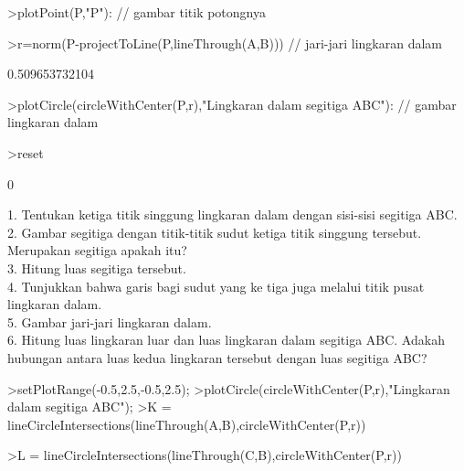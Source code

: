 \documentclass[12pt,Times new roman,letterpaper]{book}
\begin{document}
\begin{eulernootebook}
\begin{eulercomment}
\begin{eulercomment}
\begin{eulernootebook}
\begin{eulercomment}
\begin{eulercomment}
\begin{eulercomment}
\begin{eulercomment}
\begin{eulercomment}
\begin{eulercomment}
\begin{eulernotebook}
\begin{eulercomment}
\begin{eulerprompt}
>plotPoint(P,"P"): // gambar titik potongnya
\end{eulerprompt}
\begin{eulerprompt}
>r=norm(P-projectToLine(P,lineThrough(A,B))) // jari-jari lingkaran dalam
\end{eulerprompt}
\begin{euleroutput}
  0.509653732104
\end{euleroutput}
\begin{eulerprompt}
>plotCircle(circleWithCenter(P,r),"Lingkaran dalam segitiga ABC"): // gambar lingkaran dalam
\end{eulerprompt}
\begin{eulerprompt}
>reset
\end{eulerprompt}
\begin{euleroutput}
  0
\end{euleroutput}
\begin{eulercomment}
1. Tentukan ketiga titik singgung lingkaran dalam dengan sisi-sisi
segitiga ABC.\\
2. Gambar segitiga dengan titik-titik sudut ketiga titik singgung
tersebut. Merupakan segitiga apakah itu?\\
3. Hitung luas segitiga tersebut.\\
4. Tunjukkan bahwa garis bagi sudut yang ke tiga juga melalui titik
pusat lingkaran dalam.\\
5. Gambar jari-jari lingkaran dalam.\\
6. Hitung luas lingkaran luar dan luas lingkaran dalam segitiga ABC.
Adakah hubungan antara luas kedua lingkaran tersebut dengan luas
segitiga ABC?
\end{eulercomment}
\begin{eulerprompt}
>setPlotRange(-0.5,2.5,-0.5,2.5);
>plotCircle(circleWithCenter(P,r),"Lingkaran dalam segitiga ABC");
>K = lineCircleIntersections(lineThrough(A,B),circleWithCenter(P,r))
\end{eulerprompt}
\begin{euleroutput}
  [0.5,  0.5]
\end{euleroutput}
\begin{eulerprompt}
>L = lineCircleIntersections(lineThrough(C,B),circleWithCenter(P,r))

\end{eulerprompt}
\end{eulercomment}
\end{eulernotebook}
\end{eulercomment}
\end{eulercomment}
\end{eulercomment}
\end{eulercomment}
\end{eulercomment}
\end{eulercomment}
\end{eulernootebook}
\end{eulercomment}
\end{eulercomment}
\end{eulernootebook}
\end{document}
